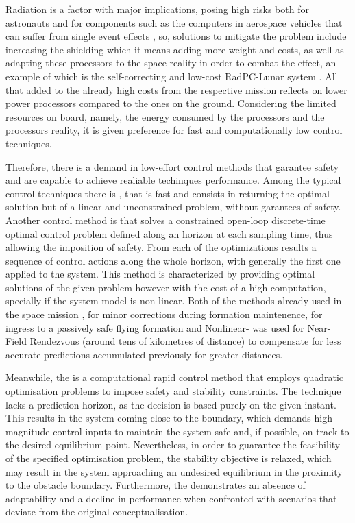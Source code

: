Radiation is a factor with major implications, posing high risks both for astronauts and for components such as the computers in aerospace vehicles that can suffer from single event effects \cite{label1996single}, so, solutions to mitigate the problem include increasing the shielding which it means adding more weight and costs, as well as adapting these processors to the space reality in order to combat the effect, an example of which is the self-correcting and low-cost RadPC-Lunar system \cite{major2021overview}. All that added to the already high costs from the respective mission reflects on lower power processors compared to the ones on the ground. Considering the limited resources on board, namely, the energy consumed by the processors and the processors reality, it is given preference for fast and computationally low control techniques. 

Therefore, there is a demand in low-effort control methods that garantee safety and are capable to achieve realiable techinques performance. Among the typical control techniques there is , that is fast and consists in returning the optimal solution but of a linear and unconstrained problem, without garantees of safety. Another control method is  that solves a constrained open-loop discrete-time optimal control problem defined along an horizon at each sampling time, thus allowing the imposition of safety. From each of the optimizations results a sequence of control actions along the whole horizon, with generally the first one applied to the system. This method is characterized by providing optimal solutions of the given problem however with the cost of a high computation, specially if the system model is non-linear. Both of the methods already used in the  space mission \cite{spiegel2023cubesat},  for minor corrections during formation maintenence,  for ingress to a passively safe flying formation and Nonlinear- was used for Near-Field Rendezvous (around tens of kilometres of distance) to compensate for less accurate predictions accumulated previously for greater distances. \par 

Meanwhile, the  is a computational rapid control method that employs quadratic optimisation problems to impose safety and stability constraints. The technique lacks a prediction horizon, as the decision is based purely on the given instant. This results in the system coming close to the boundary, which demands high magnitude control inputs to maintain the system safe and, if possible, on track to the desired equilibrium point. Nevertheless, in order to guarantee the feasibility of the specified optimisation problem, the stability objective is relaxed, which may result in the system approaching an undesired equilibrium in the proximity to the obstacle boundary. Furthermore, the  demonstrates an absence of adaptability and a decline in performance when confronted with scenarios that deviate from the original conceptualisation. 


